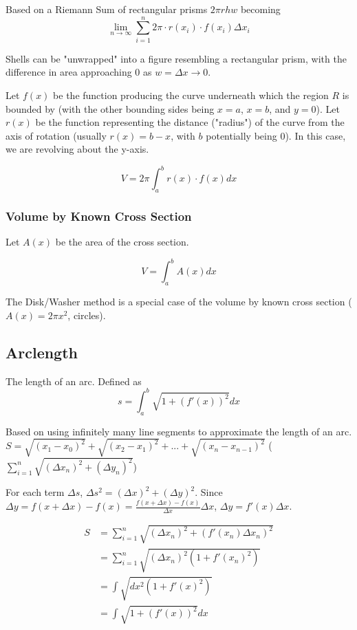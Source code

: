 \documentclass{article}
\begin{document}
Based on a Riemann Sum of rectangular prisms $2 \pi rhw$ becoming
$$\lim_{n \to \infty} \sum_{i=1}^{n} 2 \pi \cdot r(x_i) \cdot f(x_i) \Delta x_i$$

Shells can be "unwrapped" into a figure resembling a rectangular prism, with the difference in area approaching $0$ as $w = \Delta x \to 0$.

Let $f(x)$ be the function producing the curve underneath which the region $R$ is bounded by (with the other bounding sides being $x = a$, $x = b$, and $y = 0$). Let $r(x)$ be the function representing the distance ("radius") of the curve from the axis of rotation (usually $r(x) = b - x$, with $b$ potentially being $0$). In this case, we are revolving about the y-axis.

$$V = 2\pi \int_{a}^{b} r(x) \cdot f(x) dx$$

\subsubsection{Volume by Known Cross Section}
Let $A(x)$ be the area of the cross section.

$$V = \int_{a}^{b} A(x)dx$$

The Disk/Washer method is a special case of the volume by known cross section ($A(x) = 2\pi x^2$, circles).

\subsection{Arclength}
The length of an arc. Defined as
$$ s = \int_{a}^{b} \sqrt{1+(f'(x))^2} dx$$

Based on using infinitely many line segments to approximate the length of an arc.
$S = \sqrt{(x_1-x_0)^2} + \sqrt{(x_2-x_1)^2} + ... + \sqrt{(x_n-x_{n-1})^2}$ ($\sum_{i=1}^n \sqrt{(\Delta x_n)^2 + (\Delta y_n)^2}$)

For each term $\Delta s$, $\Delta s^2 = (\Delta x)^2 + (\Delta y)^2$.
Since  $\Delta y = f(x + \Delta x) - f(x) = \frac{f(x + \Delta x) - f(x)}{\Delta x}\Delta x$, $\Delta y = f'(x)\Delta x$.

\begin{align*}
    S & = \sum_{i=1}^n \sqrt{(\Delta x_n)^2 + (f'(x_n)\Delta x_n)^2} \\
      & = \sum_{i=1}^n \sqrt{(\Delta x_n)^2(1 + f'(x_n)^2)} \\
      & = \int \sqrt{dx^2(1 + f'(x)^2)} \\
      & = \int \sqrt{1 + (f'(x))^2} dx
\end{align*}
\end{document}
